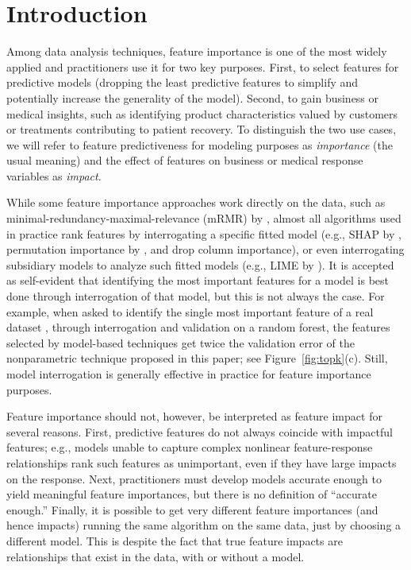 \documentclass[11pt]{article}
\newcommand{\figref}[1]{Figure~\ref{#1}}
\begin{document}
\section{Introduction}
\label{sec:intro}

Among data analysis techniques, feature importance is one of the most widely applied and practitioners use it for two key purposes. First, to select features for predictive models (dropping the least predictive features to simplify and potentially increase the generality of the model). Second, to gain business or medical insights, such as identifying product characteristics valued by customers or treatments contributing to patient recovery.  To distinguish the two use cases, we will refer to feature predictiveness for modeling purposes as {\em importance} (the usual meaning) and the effect of features on business or medical response variables as {\em impact}.

While some feature importance approaches work directly on the data, such as minimal-redundancy-maximal-relevance (mRMR) by \cite{mRMR}, almost all algorithms used in practice rank features by interrogating a specific fitted model (e.g., SHAP by \citealt{shap}, permutation importance by \citealt{RF}, and drop column importance), or even interrogating subsidiary models to analyze such fitted models (e.g., LIME by \citealt{lime}). It is accepted as self-evident that identifying the most important features for a model is best done through interrogation of that  model, but this is not always the case.  For example, when asked to identify the single most important feature of a real dataset \citep{bulldozer}, through interrogation and validation on a random forest, the features selected by model-based techniques get twice the validation error of the nonparametric technique proposed in this paper; see \figref{fig:topk}(c). Still, model interrogation is generally effective in practice for feature importance purposes.

Feature importance should not, however, be interpreted as feature impact for several reasons. First, predictive features do not always coincide with impactful features; e.g., models unable to capture complex nonlinear feature-response relationships rank such features as unimportant, even if they have large impacts on the response. Next, practitioners must develop models accurate enough to yield meaningful feature importances, but there is no definition of ``accurate enough.'' Finally, it is possible to get very different feature importances (and hence impacts) running the same algorithm on the same data, just by choosing a different model. This is despite the fact that true feature impacts are relationships that exist in the data, with or without a model.
\end{document}
